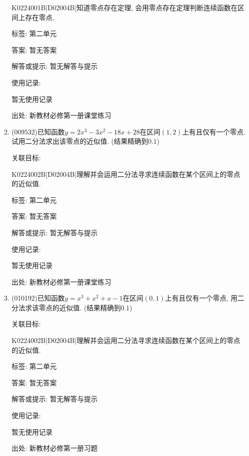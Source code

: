 \documentclass[10pt,a4paper]{article}
\begin{document}
\begin{enumerate}[1.]
K0224001B|D02004B|知道零点存在定理, 会用零点存在定理判断连续函数在区间上存在零点.



标签: 第二单元

答案: 暂无答案

解答或提示: 暂无解答与提示

使用记录:

暂无使用记录


出处: 新教材必修第一册课堂练习
\item { (009532)}已知函数$y=2x^3-3x^2-18x+28$在区间$(1, 2)$上有且仅有一个零点. 试用二分法求出该零点的近似值. (结果精确到$0.1$)


关联目标:

K0224002B|D02004B|理解并会运用二分法寻求连续函数在某个区间上的零点的近似值.



标签: 第二单元

答案: 暂无答案

解答或提示: 暂无解答与提示

使用记录:

暂无使用记录


出处: 新教材必修第一册课堂练习
\item { (010192)}已知函数$y=x^3+x^2+x-1$在区间$(0, 1)$上有且仅有一个零点, 用二分法求该零点的近似值. (结果精确到$0.1$)


关联目标:

K0224002B|D02004B|理解并会运用二分法寻求连续函数在某个区间上的零点的近似值.



标签: 第二单元

答案: 暂无答案

解答或提示: 暂无解答与提示

使用记录:

暂无使用记录


出处: 新教材必修第一册习题
\end{enumerate}
\end{document}

